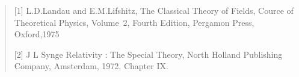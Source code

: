 \begin{small}
\begin{quote}

[1] L.D.Landau and E.M.Lifshitz, {The Classical   Theory
of Fields}, Cource of Theoretical Physics, Volume~2, Fourth 
Edition, Pergamon Press,   Oxford,1975

[2] J L Synge Relativity :  The Special Theory, North 
Holland Publishing Company, Amsterdam, 1972,  Chapter IX.

\end{quote}
\end{small}
